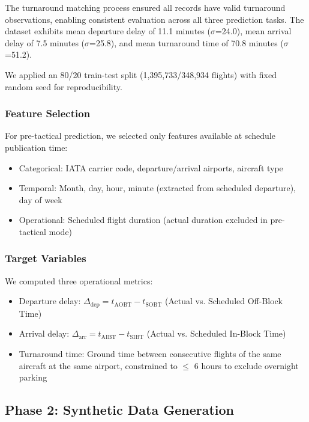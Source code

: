 \documentclass[conference]{IEEEtran}
\begin{document}
The turnaround matching process ensured all records have valid turnaround observations, enabling consistent evaluation across all three prediction tasks. The dataset exhibits mean departure delay of 11.1 minutes ($\sigma$=24.0), mean arrival delay of 7.5 minutes ($\sigma$=25.8), and mean turnaround time of 70.8 minutes ($\sigma$=51.2).

We applied an 80/20 train-test split (1,395,733/348,934 flights) with fixed random seed for reproducibility.

\subsubsection{Feature Selection}
For pre-tactical prediction, we selected only features available at schedule publication time:

\begin{itemize}
    \item Categorical: IATA carrier code, departure/arrival airports, aircraft type
    \item Temporal: Month, day, hour, minute (extracted from scheduled departure), day of week
    \item Operational: Scheduled flight duration (actual duration excluded in pre-tactical mode)
\end{itemize}

\subsubsection{Target Variables}
We computed three operational metrics:
\begin{itemize}
    \item Departure delay: $\Delta_{\text{dep}} = t_{\text{AOBT}} - t_{\text{SOBT}}$ (Actual vs. Scheduled Off-Block Time)
    \item Arrival delay: $\Delta_{\text{arr}} = t_{\text{AIBT}} - t_{\text{SIBT}}$ (Actual vs. Scheduled In-Block Time)
    \item Turnaround time: Ground time between consecutive flights of the same aircraft at the same airport, constrained to $\leq$ 6 hours to exclude overnight parking
\end{itemize}


\subsection{Phase 2: Synthetic Data Generation}


\end{document}

